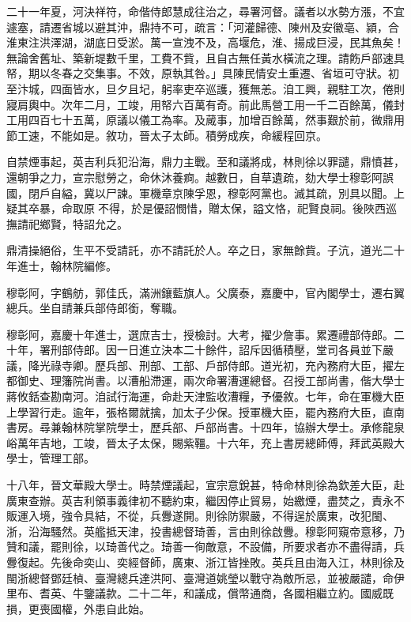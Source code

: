 \begin{pinyinscope}
二十一年夏，河決祥符，命偕侍郎慧成往治之，尋署河督。議者以水勢方漲，不宜遽塞，請遷省城以避其沖，鼎持不可，疏言：「河灌歸德、陳州及安徽亳、潁，合淮東注洪澤湖，湖底日受淤。萬一宣洩不及，高堰危，淮、揚成巨浸，民其魚矣！無論舍舊址、築新堤數千里，工費不貲，且自古無任黃水橫流之理。請飭戶部速具帑，期以冬春之交集事。不效，原執其咎。」具陳民情安土重遷、省垣可守狀。初至汴城，四面皆水，旦夕且圮，躬率吏卒巡護，獲無恙。洎工興，親駐工次，倦則寢肩輿中。次年二月，工竣，用帑六百萬有奇。前此馬營工用一千二百餘萬，儀封工用四百七十五萬，原議以儀工為率。及蕆事，加增百餘萬，然事艱於前，微鼎用節工速，不能如是。敘功，晉太子太師。積勞成疾，命緩程回京。

自禁煙事起，英吉利兵犯沿海，鼎力主戰。至和議將成，林則徐以罪譴，鼎憤甚，還朝爭之力，宣宗慰勞之，命休沐養痾。越數日，自草遺疏，劾大學士穆彰阿誤國，閉戶自縊，冀以尸諫。軍機章京陳孚恩，穆彰阿黨也。滅其疏，別具以聞。上疑其卒暴，命取原不得，於是優詔憫惜，贈太保，謚文恪，祀賢良祠。後陜西巡撫請祀鄉賢，特詔允之。

鼎清操絕俗，生平不受請託，亦不請託於人。卒之日，家無餘貲。子沆，道光二十年進士，翰林院編修。

穆彰阿，字鶴舫，郭佳氏，滿洲鑲藍旗人。父廣泰，嘉慶中，官內閣學士，遷右翼總兵。坐自請兼兵部侍郎銜，奪職。

穆彰阿，嘉慶十年進士，選庶吉士，授檢討。大考，擢少詹事。累遷禮部侍郎。二十年，署刑部侍郎。因一日進立決本二十餘件，詔斥因循積壓，堂司各員並下嚴議，降光祿寺卿。歷兵部、刑部、工部、戶部侍郎。道光初，充內務府大臣，擢左都御史、理籓院尚書。以漕船滯運，兩次命署漕運總督。召授工部尚書，偕大學士蔣攸銛查勘南河。洎試行海運，命赴天津監收漕糧，予優敘。七年，命在軍機大臣上學習行走。逾年，張格爾就擒，加太子少保。授軍機大臣，罷內務府大臣，直南書房。尋兼翰林院掌院學士，歷兵部、戶部尚書。十四年，協辦大學士。承修龍泉峪萬年吉地，工竣，晉太子太保，賜紫韁。十六年，充上書房總師傅，拜武英殿大學士，管理工部。

十八年，晉文華殿大學士。時禁煙議起，宣宗意銳甚，特命林則徐為欽差大臣，赴廣東查辦。英吉利領事義律初不聽約束，繼因停止貿易，始繳煙，盡焚之，責永不販運入境，強令具結，不從，兵釁遂開。則徐防禦嚴，不得逞於廣東，改犯閩、浙，沿海騷然。英艦抵天津，投書總督琦善，言由則徐啟釁。穆彰阿窺帝意移，乃贊和議，罷則徐，以琦善代之。琦善一徇敵意，不設備，所要求者亦不盡得請，兵釁復起。先後命奕山、奕經督師，廣東、浙江皆挫敗。英兵且由海入江，林則徐及閩浙總督鄧廷楨、臺灣總兵達洪阿、臺灣道姚瑩以戰守為敵所忌，並被嚴譴，命伊里布、耆英、牛鑒議款。二十二年，和議成，償幣通商，各國相繼立約。國威既損，更喪國權，外患自此始。


\end{pinyinscope}
